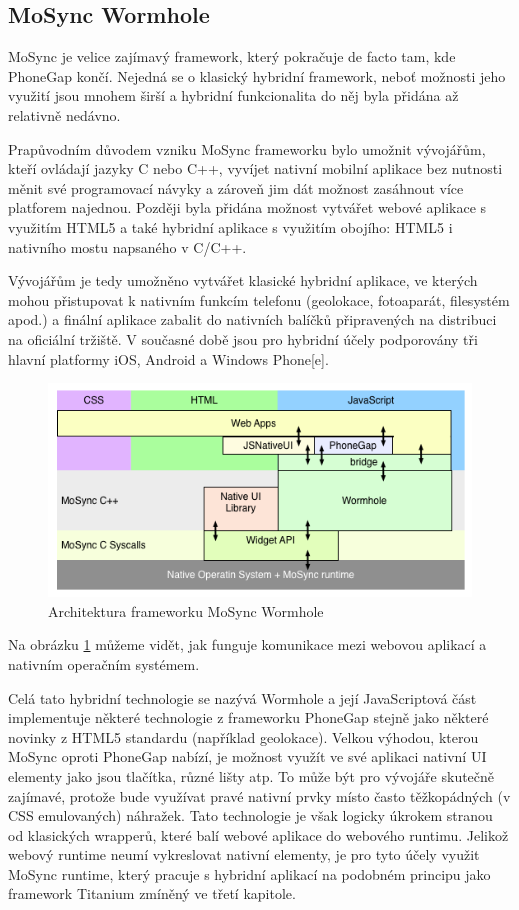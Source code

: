 \subsection{MoSync Wormhole}
MoSync je velice zajímavý framework, který pokračuje de facto tam, kde PhoneGap končí. Nejedná se o klasický hybridní framework, neboť možnosti jeho využití jsou mnohem širší a hybridní funkcionalita do něj byla přidána až relativně nedávno.

Prapůvodním důvodem vzniku MoSync frameworku bylo umožnit vývojářům, kteří ovládají jazyky C nebo C++, vyvíjet nativní mobilní aplikace bez nutnosti měnit své programovací návyky a zároveň jim dát možnost zasáhnout více platforem najednou. Později byla přidána možnost vytvářet webové aplikace s využitím HTML5 a také hybridní aplikace s využitím obojího: HTML5 i nativního mostu napsaného v C/C++.

Vývojářům je tedy umožněno vytvářet klasické hybridní aplikace, ve kterých mohou přistupovat k nativním funkcím telefonu (geolokace, fotoaparát, filesystém apod.) a finální aplikace zabalit do nativních balíčků připravených na distribuci na oficiální tržiště. V současné době jsou pro hybridní účely podporovány tři hlavní platformy iOS, Android a Windows Phone[e].

\begin{figure}\centering
\includegraphics[width=1.0\textwidth]{MoSyncUI_Layers.png}
\caption{Architektura frameworku MoSync Wormhole \cite{JavaScript_for_native_widgets}}
\label{fig:MoSyncWormholeArchitecture}
\end{figure} 

Na obrázku \ref{fig:MoSyncWormholeArchitecture} můžeme vidět, jak funguje komunikace mezi webovou aplikací a nativním operačním systémem.

Celá tato hybridní technologie se nazývá Wormhole a její JavaScriptová část implementuje některé technologie z frameworku PhoneGap stejně jako některé novinky z HTML5 standardu (například geolokace). Velkou výhodou, kterou MoSync oproti PhoneGap nabízí, je možnost využít ve své aplikaci nativní UI elementy jako jsou tlačítka, různé lišty atp. To může být pro vývojáře skutečně zajímavé, protože bude využívat pravé nativní prvky místo často těžkopádných (v CSS emulovaných) náhražek. Tato technologie je však logicky úkrokem stranou od klasických wrapperů, které balí webové aplikace do webového runtimu. Jelikož webový runtime neumí vykreslovat nativní elementy, je pro tyto účely využit MoSync runtime, který pracuje s hybridní aplikací na podobném principu jako framework Titanium zmíněný ve třetí kapitole.

